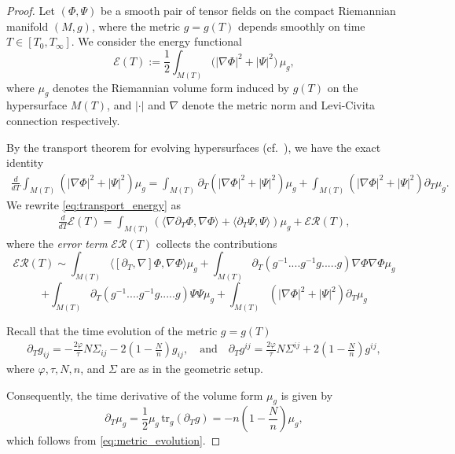 \documentclass{amsart}
\begin{document}
\begin{proof}
Let $(\Phi, \Psi)$ be a smooth pair of tensor fields on the compact Riemannian manifold $(M,g)$, where the metric $g = g(T)$ depends smoothly on time $T \in [T_0, T_\infty]$. We consider the energy functional
\[
\mathscr{E}(T) := \frac{1}{2} \int_{M(T)} \big( |\nabla \Phi|^2 + |\Psi|^2 \big) \, \mu_g,
\]
where $\mu_g$ denotes the Riemannian volume form induced by $g(T)$ on the hypersurface $M(T)$, and $|\cdot|$ and $\nabla$ denote the metric norm and Levi-Civita connection respectively.
 
\noindent By the transport theorem for evolving hypersurfaces (cf.~\cite{marsden}), we have the exact identity
\begin{align} \label{eq:transport_energy}
\frac{d}{dT} \int_{M(T)} \left( |\nabla \Phi|^2 + |\Psi|^2 \right) \mu_g
= \int_{M(T)} \partial_T \left( |\nabla \Phi|^2 + |\Psi|^2 \right) \mu_g
+ \int_{M(T)} \left( |\nabla \Phi|^2 + |\Psi|^2 \right) \partial_T \mu_g.
\end{align}
We rewrite \eqref{eq:transport_energy} as
\begin{align} \label{eq:energy_derivative}
\frac{d}{dT} \mathscr{E}(T) 
= \int_{M(T)} \left( \langle \nabla \partial_T \Phi, \nabla \Phi \rangle + \langle \partial_T \Psi, \Psi \rangle \right) \mu_g 
+ \mathscr{ER}(T),
\end{align}
where the \emph{error term} $\mathscr{ER}(T)$ collects the contributions
\[
 \mathscr{ER}(T)\sim \int_{M(T)}\langle[\partial_{T},\nabla]\Phi,\nabla\Phi\rangle\mu_{g}  +\int_{M(T)}\partial_{T}(g^{-1}....g^{-1}g.....g)\nabla\Phi\nabla\Phi\mu_{g}\]
 \[+\int_{M(T)}\partial_{T}(g^{-1}....g^{-1}g.....g)\Psi\Psi\mu_{g}+\int_{M(T)}(|\nabla\Phi|^{2}+|\Psi|^{2})\partial_{T}\mu_{g}  
\]
 
\noindent Recall that the time evolution of the metric $g = g(T)$
\begin{align} \label{eq:metric_evolution}
\partial_T g_{ij} = -\frac{2\varphi}{\tau} N \Sigma_{ij} - 2 \left(1 - \frac{N}{n}\right) g_{ij},
\quad\text{and}\quad
\partial_T g^{ij} = \frac{2\varphi}{\tau} N \Sigma^{ij} + 2 \left(1 - \frac{N}{n}\right) g^{ij},
\end{align}
where $\varphi, \tau, N, n$, and $\Sigma$ are as in the geometric setup.

\noindent Consequently, the time derivative of the volume form $\mu_g$ is given by
\[
\partial_T \mu_g = \frac{1}{2} \mu_g \, \mathrm{tr}_g (\partial_T g) = - n \left(1 - \frac{N}{n}\right) \mu_g,
\]
which follows from \eqref{eq:metric_evolution}.


\end{proof}
\end{document}
